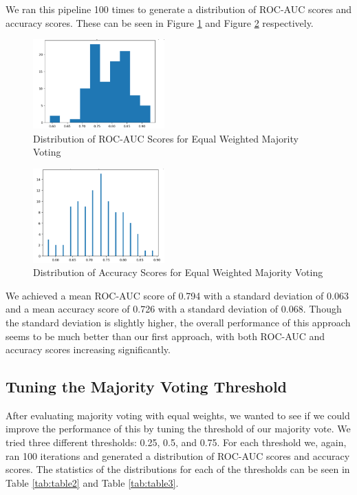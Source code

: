 \documentclass[10pt,twocolumn,letterpaper]{article}
\begin{document}
We ran this pipeline 100 times to generate a distribution of ROC-AUC scores and accuracy scores. These can be seen in Figure \ref{fig:rocauc2} and Figure \ref{fig:accuracy2} respectively.

\begin{figure}[h]
  \centering
  \includegraphics[width=0.45\textwidth]{imgs/equal_bias_roc.png}
  \caption{Distribution of ROC-AUC Scores for Equal Weighted Majority Voting}
  \label{fig:rocauc2}
\end{figure}

\begin{figure}[h]
  \centering
  \includegraphics[width=0.45\textwidth]{imgs/equal_bias_acc.png}
  \caption{Distribution of Accuracy Scores for Equal Weighted Majority Voting}
  \label{fig:accuracy2}
\end{figure}

We achieved a mean ROC-AUC score of 0.794 with a standard deviation of 0.063 and a mean accuracy score of 0.726
with a standard deviation of 0.068. Though the standard deviation is slightly higher, the overall performance of this approach seems
to be much better than our first approach, with both ROC-AUC and accuracy scores increasing significantly.

\subsection{Tuning the Majority Voting Threshold}
After evaluating majority voting with equal weights, we wanted to see if we could improve the performance of this by tuning the threshold of our majority vote. We tried three different thresholds: 0.25, 0.5, and 0.75. For 
each threshold we, again, ran 100 iterations and generated a distribution of ROC-AUC scores and accuracy scores. The statistics of the distributions for each of the thresholds can be seen in Table \ref{tab:table2} and Table \ref{tab:table3}.
\end{document}
